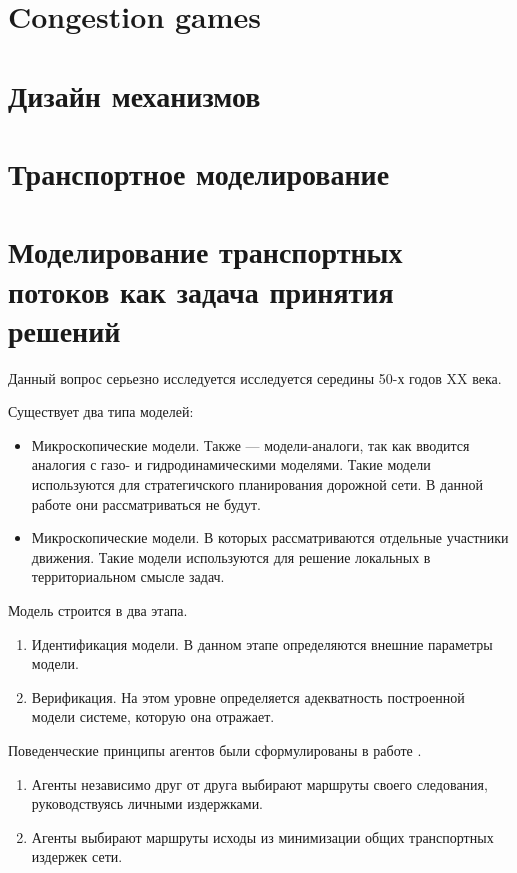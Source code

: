 \section{Congestion games\cite{Christodoulou-G.:2005ab}}
\section{Дизайн механизмов}


\section{Транспортное моделирование}
\section{Моделирование транспортных потоков как задача принятия решений}

Данный вопрос серьезно исследуется исследуется середины 50-х годов XX века.

Существует два типа моделей:
\begin{itemize}
	\item Микроскопические модели. Также --- модели-аналоги, так как вводится аналогия с газо- и гидродинамическими моделями. Такие модели используются для стратегичского планирования дорожной сети. В данной работе они рассматриваться не будут. 
	\item Микроскопические модели. В которых рассматриваются отдельные участники движения. Такие модели используются для решение локальных в территориальном смысле задач.
\end{itemize} \cite[225]{gas}

Модель строится в два этапа.

\begin{enumerate}
	\item Идентификация модели. В данном этапе определяются внешние параметры модели.
	\item Верификация. На этом уровне определяется адекватность построенной модели системе, которую она отражает.
\end{enumerate} \cite[225-226]{gas}

Поведенческие принципы агентов были сформулированы в работе \cite{wardrop}.



\begin{enumerate}
	\item Агенты независимо друг от друга выбирают маршруты своего следования, руководствуясь личными издержками.
	\item Агенты выбирают маршруты исходы из минимизации общих транспортных издержек сети.
\end{enumerate}

